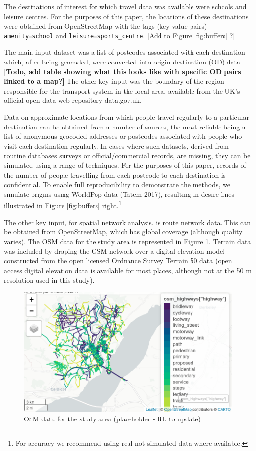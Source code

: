 \documentclass[galley]{jtlu-article-2col}
\begin{document}
The destinations of interest for which travel data was available were schools and leisure centres.
For the purposes of this paper, the locations of these destinations were obtained from OpenStreetMap with the tags (key-value pairs) \texttt{amenity=school} and \texttt{leisure=sports\_centre}.
{[}Add to Figure \ref{fig:buffers} ?{]}

The main input dataset was a list of postcodes associated with each destination which, after being geocoded, were converted into origin-destination (OD) data.
\textbf{{[}Todo, add table showing what this looks like with specific OD pairs linked to a map?{]}}
The other key input was the boundary of the region responsible for the transport system in the local area, available from the UK's official open data web repository data.gov.uk.

Data on approximate locations from which people travel regularly to a particular destination can be obtained from a number of sources, the most reliable being a list of anonymous geocoded addresses or postcodes associated with people who visit each destination regularly.
In cases where such datasets, derived from routine databases surveys or official/commercial records, are missing, they can be simulated using a range of techniques.
For the purposes of this paper, records of the number of people travelling from each postcode to each destination is confidential.
To enable full reproducibility to demonstrate the methods, we simulate origins using WorldPop data (Tatem 2017), resulting in desire lines illustrated in Figure \ref{fig:buffers} right.\footnote{
  For accuracy we recommend using real not simulated data where available.}

The other key input, for spatial network analysis, is route network data.
This can be obtained from OpenStreetMap, which has global coverage (although quality varies).
The OSM data for the study area is represented in Figure \ref{fig:osminput}.
Terrain data was included by draping the OSM network over a digital elevation model constructed from the open licensed Ordnance Survey Terrain 50 data (open access digital elevation data is available for most places, although not at the 50 m resolution used in this study).

\begin{figure}

{\centering \includegraphics[width=0.5\linewidth]{figures/osm-infra-chepstow} 

}

\caption{OSM data for the study area (placeholder - RL to update)}\label{fig:osminput}
\end{figure}
\end{document}
